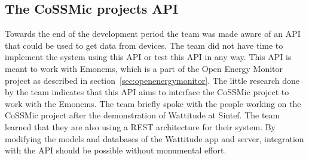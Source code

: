 \subsection{The CoSSMic projects API}
\label{sec:cossmicapi}
Towards the end of the development period the team was made aware of an API that could be used to get data from devices. The team did not have time to implement the system using this API or test this API in any way. This API is meant to work with Emoncms, which is a part of the Open Energy Monitor project as described in section~\ref{sec:openenergymonitor}. The little research done by the team indicates that this API aims to interface the CoSSMic project to work with the Emoncms. The team briefly spoke with the people working on the CoSSMic project after the demonstration of Wattitude at Sintef. The team learned that they are also using a REST architecture for their system. By modifying the models and databases of the Wattitude app and server, integration with the API should be possible without monumental effort.

